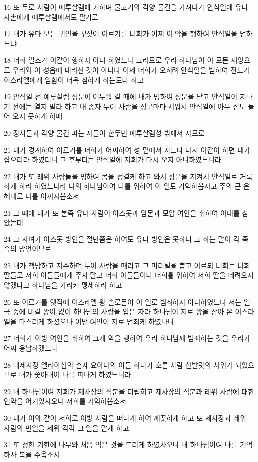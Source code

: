 \par 16 또 두로 사람이 예루살렘에 거하며 물고기와 각양 물건을 가져다가 안식일에 유다 자손에게 예루살렘에서도 팔기로
\par 17 내가 유다 모든 귀인을 꾸짖어 이르기를 너희가 어찌 이 악을 행하여 안식일을 범하느냐
\par 18 너희 열조가 이같이 행하지 아니 하였느냐 그러므로 우리 하나님이 이 모든 재앙으로 우리와 이 성읍에 내리신 것이 아니냐 이제 너희가 오히려 안식일을 범하여 진노가 이스라엘에게 임함이 더욱 심하게 하는도다 하고
\par 19 안식일 전 예루살렘 성문이 어두워 갈 때에 내가 명하여 성문을 닫고 안식일이 지나기 전에는 열지 말라 하고 내 종자 두어 사람을 성문마다 세워서 안식일에 아무 짐도 들어 오지 못하게 하매
\par 20 장사들과 각양 물건 파는 자들이 한두번 예루살렘성 밖에서 자므로
\par 21 내가 경계하여 이르기를 너희가 어찌하여 성 밑에서 자느냐 다시 이같이 하면 내가 잡으리라 하였더니 그 후부터는 안식일에 저희가 다시 오지 아니하였느니라
\par 22 내가 또 레위 사람들을 명하여 몸을 정결케 하고 와서 성문을 지켜서 안식일로 거룩하게 하라 하였느니라 나의 하나님이여 나를 위하여 이 일도 기억하옵시고 주의 큰 은혜대로 나를 아끼시옵소서
\par 23 그 때에 내가 또 본즉 유다 사람이 아스돗과 암몬과 모압 여인을 취하여 아내를 삼았는데
\par 24 그 자녀가 아스돗 방언을 절반쯤은 하여도 유다 방언은 못하니 그 하는 말이 각 족속의 방언이므로
\par 25 내가 책망하고 저주하며 두어 사람을 때리고 그 머리털을 뽑고 이르되 너희는 너희 딸들로 저희 아들들에게 주지 말고 너희 아들들이나 너희를 위하여 저희 딸을 데려오지 않겠다고 하나님을 가리켜 맹세하라 하고
\par 26 또 이르기를 옛적에 이스라엘 왕 솔로몬이 이 일로 범죄하지 아니하였느냐 저는 열국 중에 비길 왕이 없이 하나님의 사랑을 입은 자라 하나님이 저로 왕을 삼아 온 이스라엘을 다스리게 하셨으나 이방 여인이 저로 범죄케 하였나니
\par 27 너희가 이방 여인을 취하여 크게 악을 행하여 우리 하나님께 범죄하는 것을 우리가 어찌 용납하겠느냐
\par 28 대제사장 엘리아십의 손자 요야다의 아들 하나가 호론 사람 산발랏의 사위가 되었으므로 내가 쫓아내어 나를 떠나게 하였느니라
\par 29 내 하나님이여 저희가 제사장의 직분을 더럽히고 제사장의 직분과 레위 사람에 대한 언약을 어기었사오니 저희를 기억하옵소서
\par 30 내가 이와 같이 저희로 이방 사람을 떠나게 하여 깨끗하게 하고 또 제사장과 레위 사람의 반열을 세워 각각 그 일을 맡게 하고
\par 31 또 정한 기한에 나무와 처음 익은 것을 드리게 하였사오니 내 하나님이여 나를 기억하사 복을 주옵소서


